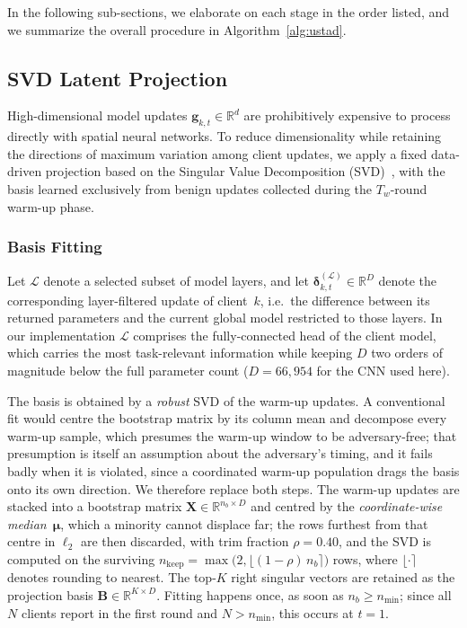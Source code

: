 \documentclass[journal]{IEEEtran}
\begin{document}
In the following sub-sections, we elaborate on each stage in the order listed, and we summarize the overall procedure in Algorithm~\ref{alg:ustad}.

\subsection{SVD Latent Projection}
\label{sec:svd_projection}

High-dimensional model updates $\mathbf{g}_{k,t} \in \mathbb{R}^d$ are prohibitively expensive to process directly with spatial neural networks. To reduce dimensionality while retaining the directions of maximum variation among client updates, we apply a fixed data-driven projection based on the Singular Value Decomposition (SVD)~\cite{zhang2015singular}, with the basis learned exclusively from benign updates collected during the $T_w$-round warm-up phase.

\subsubsection{Basis Fitting}
Let $\mathcal{L}$ denote a selected subset of model layers, and let $\boldsymbol{\delta}_{k,t}^{(\mathcal{L})} \in \mathbb{R}^{D}$ denote the corresponding layer-filtered update of client~$k$, i.e.\ the difference between its returned parameters and the current global model restricted to those layers. In our implementation $\mathcal{L}$ comprises the fully-connected head of the client model, which carries the most task-relevant information while keeping $D$ two orders of magnitude below the full parameter count ($D = 66{,}954$ for the CNN used here).

The basis is obtained by a \emph{robust} SVD of the warm-up updates. A conventional fit would centre the bootstrap matrix by its column mean and decompose every warm-up sample, which presumes the warm-up window to be adversary-free; that presumption is itself an assumption about the adversary's timing, and it fails badly when it is violated, since a coordinated warm-up population drags the basis onto its own direction. We therefore replace both steps. The warm-up updates are stacked into a bootstrap matrix $\mathbf{X} \in \mathbb{R}^{n_b \times D}$ and centred by the \emph{coordinate-wise median}~$\boldsymbol{\mu}$, which a minority cannot displace far; the rows furthest from that centre in $\ell_2$ are then discarded, with trim fraction $\rho = 0.40$, and the SVD is computed on the surviving $n_{\mathrm{keep}} = \max\bigl(2, \lfloor (1-\rho)\, n_b \rceil\bigr)$ rows, where $\lfloor \cdot \rceil$ denotes rounding to nearest. The top-$K$ right singular vectors are retained as the projection basis $\mathbf{B} \in \mathbb{R}^{K \times D}$. Fitting happens once, as soon as $n_b \geq n_{\min}$; since all $N$ clients report in the first round and $N > n_{\min}$, this occurs at $t = 1$.
\end{document}
